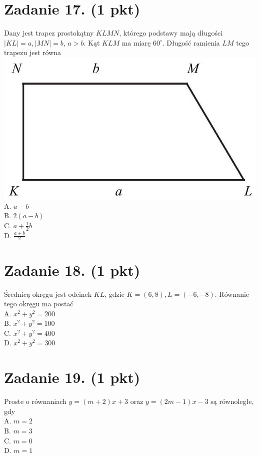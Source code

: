 \documentclass[10pt]{article}
\begin{document}
\section*{Zadanie 17. (1 pkt)}
Dany jest trapez prostokątny \(K L M N\), którego podstawy mają długości \(|K L|=a,|M N|=b\), \(a>b\). Kąt \(K L M\) ma miarę \(60^{\circ}\). Długość ramienia \(L M\) tego trapezu jest równa\\
\includegraphics[max width=\textwidth, center]{2024_11_21_9383c97fb44abf35abe9g-08}\\
A. \(a-b\)\\
B. \(2(a-b)\)\\
C. \(a+\frac{1}{2} b\)\\
D. \(\frac{a+b}{2}\)

\section*{Zadanie 18. (1 pkt)}
Średnicą okręgu jest odcinek \(K L\), gdzie \(K=(6,8), L=(-6,-8)\). Równanie tego okręgu ma postać\\
A. \(x^{2}+y^{2}=200\)\\
B. \(x^{2}+y^{2}=100\)\\
C. \(x^{2}+y^{2}=400\)\\
D. \(x^{2}+y^{2}=300\)

\section*{Zadanie 19. (1 pkt)}
Proste o równaniach \(y=(m+2) x+3\) oraz \(y=(2 m-1) x-3\) są równoległe, gdy\\
A. \(m=2\)\\
B. \(m=3\)\\
C. \(m=0\)\\
D. \(m=1\)
\end{document}
